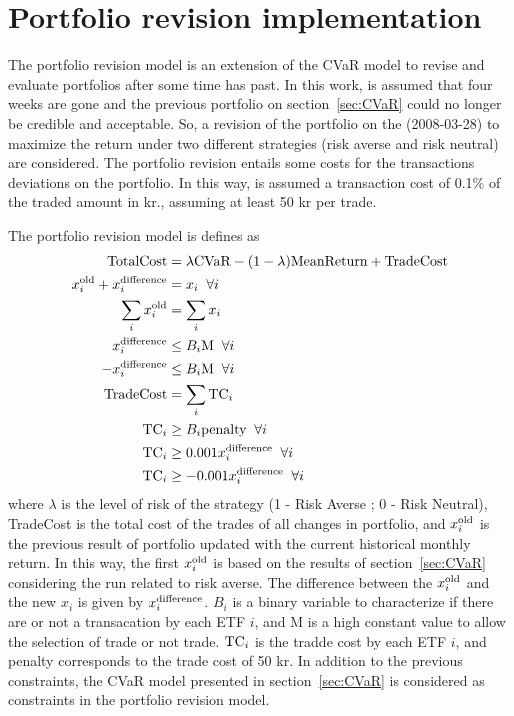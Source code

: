 \section{Portfolio revision implementation}
The portfolio revision model is an extension of the CVaR model to revise and evaluate portfolios after some time has past.
In this work, is assumed that four weeks are gone and the previous portfolio on section~\ref{sec:CVaR} could no longer be credible and acceptable.
So, a revision of the portfolio on the (2008-03-28) to maximize the return under two different strategies (risk averse and risk neutral) are considered.
The portfolio revision entails some costs for the transactions deviations on the portfolio.
In this way, is assumed a transaction cost of 0.1\% of the traded amount in kr., assuming at least 50 kr per trade.

The portfolio revision model is defines as
\begin{align}
\textup{TotalCost} &= \lambda \textup{CVaR} - {\left( 1 - \lambda \right)} \textup{MeanReturn} + \textup{TradeCost} \\
x^{\textup{old}}_{i} + x^{\textup{difference}}_{i} &= x_{i} \; \; \forall i \\
\sum_{i} x^{\textup{old}}_{i} &= \sum_{i} x_{i} \\
x^{\textup{difference}}_{i} &\le B_{i} \textup{M} \; \; \forall i \\
-x^{\textup{difference}}_{i} &\le B_{i} \textup{M} \; \; \forall i \\
\textup{TradeCost} &= \sum_{i} \textup{TC}_{i} \\
\textup{TC}_{i} &\ge B_{i} \textup{penalty} \; \; \forall i \\
\textup{TC}_{i} &\ge 0.001 x^{\textup{difference}}_{i} \; \; \forall i \\
\textup{TC}_{i} &\ge - 0.001 x^{\textup{difference}}_{i} \; \; \forall i \\
\end{align}
where $\lambda$ is the level of risk of the strategy (1 - Risk Averse ; 0 - Risk Neutral), TradeCost is the total cost of the trades of all changes in portfolio, and $x^{\textup{old}}_{i}$ is the previous result of portfolio updated with the current historical monthly return.
In this way, the first $x^{\textup{old}}_{i}$ is based on the results of section~\ref{sec:CVaR} considering the run related to risk averse.
The difference between the $x^{\textup{old}}_{i}$ and the new $x_{i}$ is given by $x^{\textup{difference}}_{i}$.
$B_{i}$ is a binary variable to characterize if there are or not a transacation by each ETF $i$, and M is a high constant value to allow the selection of trade or not trade.
$\textup{TC}_{i}$ is the tradde cost by each ETF $i$, and penalty corresponds to the trade cost of 50 kr.
In addition to the previous constraints, the CVaR model presented in section~\ref{sec:CVaR} is considered as constraints in the portfolio revision model.

